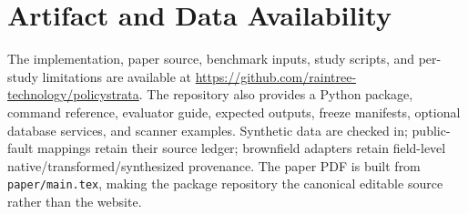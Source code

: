 \section{Artifact and Data Availability}

The implementation, paper source, benchmark inputs, study scripts, and per-study limitations are available at \url{https://github.com/raintree-technology/policystrata}. The repository also provides a Python package, command reference, evaluator guide, expected outputs, freeze manifests, optional database services, and scanner examples. Synthetic data are checked in; public-fault mappings retain their source ledger; brownfield adapters retain field-level native/transformed/synthesized provenance. The paper PDF is built from \texttt{paper/main.tex}, making the package repository the canonical editable source rather than the website.

\newpage
